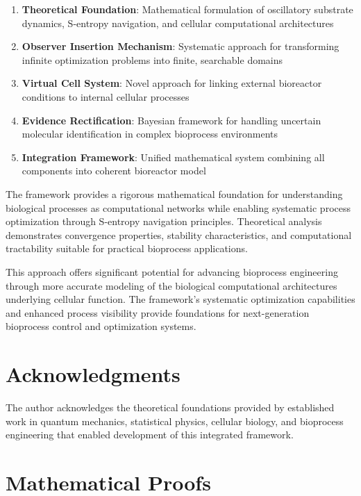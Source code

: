 \documentclass[12pt,a4paper]{article}
\begin{document}
\begin{enumerate}
\item \textbf{Theoretical Foundation}: Mathematical formulation of oscillatory substrate dynamics, S-entropy navigation, and cellular computational architectures
\item \textbf{Observer Insertion Mechanism}: Systematic approach for transforming infinite optimization problems into finite, searchable domains
\item \textbf{Virtual Cell System}: Novel approach for linking external bioreactor conditions to internal cellular processes
\item \textbf{Evidence Rectification}: Bayesian framework for handling uncertain molecular identification in complex bioprocess environments
\item \textbf{Integration Framework}: Unified mathematical system combining all components into coherent bioreactor model
\end{enumerate}

The framework provides a rigorous mathematical foundation for understanding biological processes as computational networks while enabling systematic process optimization through S-entropy navigation principles. Theoretical analysis demonstrates convergence properties, stability characteristics, and computational tractability suitable for practical bioprocess applications.

This approach offers significant potential for advancing bioprocess engineering through more accurate modeling of the biological computational architectures underlying cellular function. The framework's systematic optimization capabilities and enhanced process visibility provide foundations for next-generation bioprocess control and optimization systems.

\section{Acknowledgments}

The author acknowledges the theoretical foundations provided by established work in quantum mechanics, statistical physics, cellular biology, and bioprocess engineering that enabled development of this integrated framework.




\appendix

\section{Mathematical Proofs}
\end{document}
